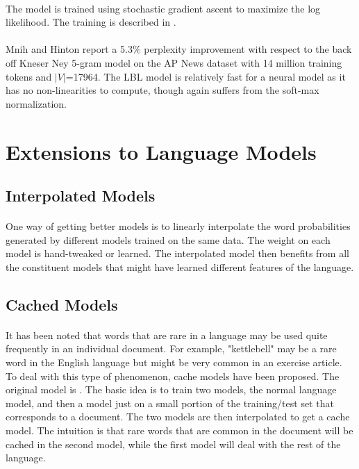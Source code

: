 \paragraph{}
The model is trained using stochastic gradient ascent to maximize the log likelihood. The training is described in \cite{MnihHinton2007}.
\paragraph{}
Mnih and Hinton report a 5.3\% perplexity improvement with respect to the back off Kneser Ney 5-gram model on the AP News dataset with 14 million training tokens and $|V|$=17964. The LBL model is relatively fast for a neural model as it has no non-linearities to compute, though again suffers from the soft-max normalization. 

\section {Extensions to Language Models}
\subsection{Interpolated Models}
\paragraph{}
One way of getting better models is to linearly interpolate the word probabilities generated by different models trained on the same data. The weight on each model is hand-tweaked or learned. The interpolated model then benefits from all the constituent models that might have learned different features of the language.
\subsection{Cached Models}
\paragraph{}
It has been noted that words that are rare in a language may be used quite frequently in an individual document. For example, "kettlebell" may be a rare word in the English language but might be very common in an exercise article. To deal with this type of phenomenon, cache models have been proposed. The original model is \cite{Kuhn1990}. The basic idea is to train two models, the normal language model, and then a model just on a small portion of the training/test set that corresponds to a document. The two models are then interpolated to get a cache model. The intuition is that rare words that are common in the document will be cached in the second model, while the first model will deal with the rest of the language.

